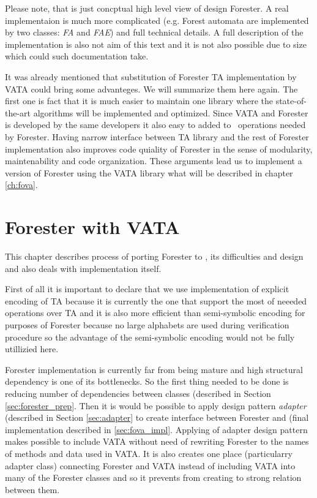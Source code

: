 Please note, that is just concptual high level view of design Forester.
A real implementaion is much more complicated (e.g. Forest automata are implemented by two classes: \emph{FA} and \emph{FAE})
and full technical details.
A full description of the implementation is also not aim of this text and it is not
also possible due to size which could such documentation take.

It was already mentioned that substitution of Forester TA implementation by
VATA could bring some advanteges.
We will summarize them here again.
The first one is fact that it is much easier to maintain one library where
the state-of-the-art algorithms will be implemented and optimized.
Since VATA and Forester is developed by the same developers it also easy to added
to \vata\ operations needed by Forester.
Having narrow interface between TA library and the rest of Forester implementation
also improves code quiality of Forester in the sense of modularity, maintenability and code organization.
These arguments lead us to implement a version of Forester using the VATA library what will be described in chapter \ref{ch:fova}.

\chapter{Forester with VATA}
\label{sec:fova}

This chapter describes process of porting Forester to \vata, its difficulties and design and also deals with implementation
itself.

First of all it is important to declare that we use \vata implementation of explicit encoding of TA because
it is currently the one that support the most of neeeded operations over TA and it is also more efficient than
semi-symbolic encoding for purposes of Forester because no large alphabets are used during verification procedure
so the advantage of the semi-symbolic encoding would not be fully utillizied here.

Forester implementation is currently far from being mature and high structural dependency is
one of its bottlenecks.
So the first thing needed to be done is reducing number of dependencies between classes (described in Section \ref{sec:forester_prep}.
Then it is would be possible to apply design pattern \emph{adapter} \cite{gamma} (described in Section \ref{sec:adapter} to create
interface between Forester and \vata (final implementation described in \ref{sec:fova_impl}.
Applying of adapter design pattern makes possible to include VATA without need of rewriting
Forester to the names of methods and data used in VATA.
It is also creates one place (particularry adapter class) connecting Forester and VATA instead of
including VATA into many of the Forester classes and so it prevents from creating to strong relation between them.

